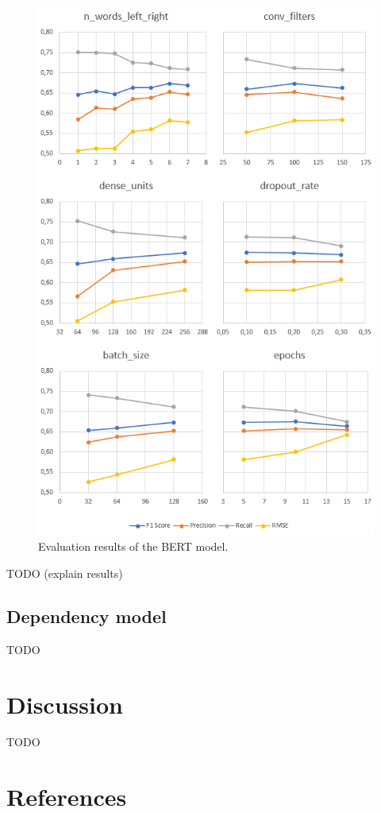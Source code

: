 \documentclass[11pt,a4paper]{article}
\begin{document}
\begin{figure}[h]
\centering
\includegraphics[width=1.0\columnwidth]{bert-model-results.png}
\caption{Evaluation results of the BERT model.}
\label{fig:bert-model-results}
\end{figure}

TODO (explain results)

\subsection{Dependency model}

TODO



\section{Discussion}

TODO



\section{References}



\end{document}
